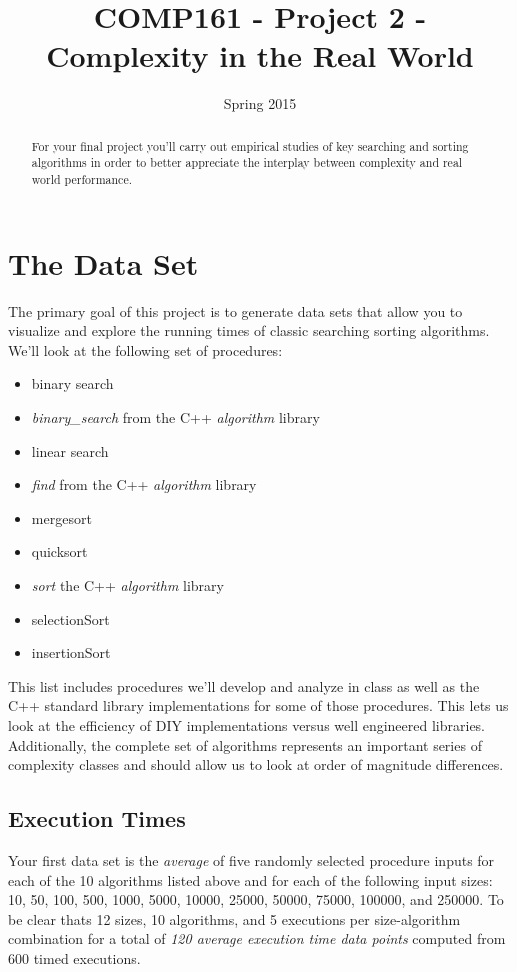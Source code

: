 \documentclass[]{tufte-handout}
\title{COMP161 - Project 2 - Complexity in the Real World}
\author{}
\date{Spring 2015}
\begin{document}
\maketitle

\begin{abstract}
For your final project you'll carry out empirical studies of key searching and sorting algorithms in order to better appreciate the interplay between complexity and real world performance.
\end{abstract}

\section{The Data Set}

The primary goal of this project is to generate data sets that allow you to visualize and explore the running times of classic searching sorting algorithms. We'll look at the following set of procedures: 
\begin{itemize}
\item binary search 
\item  \textit{binary\_search} from the C++ \textit{algorithm} library 
\item linear search 
\item  \textit{find} from the C++ \textit{algorithm} library
\item mergesort 
\item quicksort 
\item \textit{sort} the C++ \textit{algorithm} library 
\item selectionSort 
\item insertionSort 
\end{itemize}
This list includes procedures we'll develop and analyze in class as well as the C++ standard library implementations for some of those procedures. This lets us look at the efficiency of DIY implementations versus well engineered libraries. Additionally, the complete set of algorithms represents an important series of complexity classes and should allow us to look at order of magnitude differences. 



\subsection{Execution Times}

Your first data set is the \textit{average} of five randomly selected procedure inputs for each of the 10 algorithms listed above and for each of the following input sizes: 10, 50, 100, 500, 1000, 5000, 10000, 25000, 50000, 75000, 100000, and 250000. To be clear thats 12 sizes, 10 algorithms, and 5 executions per size-algorithm combination for a total of \textit{120 average execution time data points} computed from 600 timed executions.
\end{document}
